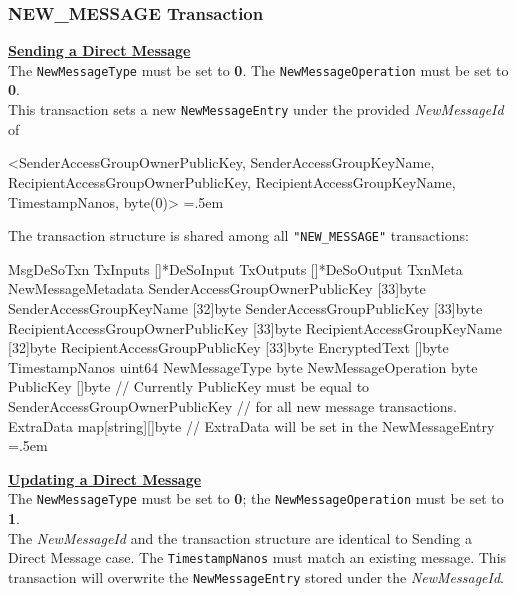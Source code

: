 \documentclass[oneside, 12pt]{article}
\newenvironment{lcverbatim}
 {\SaveVerbatim{cverb}}
 {\endSaveVerbatim
  \flushleft\fboxrule=0pt\fboxsep=.5em
  \colorbox{cverbbg}{%
    \makebox[\dimexpr\linewidth-2\fboxsep][l]{\BUseVerbatim{cverb}}%
  }
  \endflushleft
}
\begin{document}
\subsubsection{NEW\_MESSAGE Transaction}

\noindent\underline{\textbf{Sending a Direct Message}}\\
The \texttt{NewMessageType} must be set to \textbf{0}. The \texttt{NewMessageOperation} must be set to \textbf{0}.\\
This transaction sets a new \texttt{NewMessageEntry} under the provided \textit{NewMessageId} of

\begin{scriptsize}
\begin{lcverbatim}
<SenderAccessGroupOwnerPublicKey, SenderAccessGroupKeyName, RecipientAccessGroupOwnerPublicKey,
 RecipientAccessGroupKeyName, TimestampNanos, byte(0)>
\end{lcverbatim}
\end{scriptsize}

\noindent The transaction structure is shared among all \texttt{"NEW\_MESSAGE"} transactions:

\begin{lcverbatim}
MsgDeSoTxn
{
    TxInputs  []*DeSoInput
    TxOutputs []*DeSoOutput
    TxnMeta   NewMessageMetadata {
        SenderAccessGroupOwnerPublicKey    [33]byte
        SenderAccessGroupKeyName           [32]byte
        SenderAccessGroupPublicKey         [33]byte
        RecipientAccessGroupOwnerPublicKey [33]byte
        RecipientAccessGroupKeyName        [32]byte
        RecipientAccessGroupPublicKey      [33]byte
        EncryptedText                      []byte
        TimestampNanos                     uint64
        NewMessageType                     byte
        NewMessageOperation                byte
    }
    PublicKey []byte
        // Currently PublicKey must be equal to SenderAccessGroupOwnerPublicKey
        // for all new message transactions.
    ExtraData map[string][]byte
        // ExtraData will be set in the NewMessageEntry
}
\end{lcverbatim}

\noindent\underline{\textbf{Updating a Direct Message}}\\
The \texttt{NewMessageType} must be set to \textbf{0}; the \texttt{NewMessageOperation} must be set to \textbf{1}.\\
The \textit{NewMessageId} and the transaction structure are identical to Sending a Direct Message case. The \texttt{TimestampNanos} must match an existing message. This transaction will overwrite the \texttt{NewMessageEntry} stored under the \textit{NewMessageId}.\\
\end{document}
